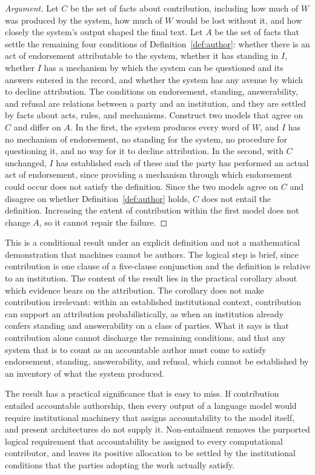 \documentclass[12pt]{article}
\theoremstyle{definition}
\theoremstyle{plain}
\begin{document}
\begin{proof}[Argument]
Let $C$ be the set of facts about contribution, including how much of $W$ was produced by the system, how much of $W$ would be lost without it, and how closely the system's output shaped the final text. Let $A$ be the set of facts that settle the remaining four conditions of Definition~\ref{def:author}: whether there is an act of endorsement attributable to the system, whether it has standing in $I$, whether $I$ has a mechanism by which the system can be questioned and its answers entered in the record, and whether the system has any avenue by which to decline attribution. The conditions on endorsement, standing, answerability, and refusal are relations between a party and an institution, and they are settled by facts about acts, rules, and mechanisms. Construct two models that agree on $C$ and differ on $A$. In the first, the system produces every word of $W$, and $I$ has no mechanism of endorsement, no standing for the system, no procedure for questioning it, and no way for it to decline attribution. In the second, with $C$ unchanged, $I$ has established each of these and the party has performed an actual act of endorsement, since providing a mechanism through which endorsement could occur does not satisfy the definition. Since the two models agree on $C$ and disagree on whether Definition~\ref{def:author} holds, $C$ does not entail the definition. Increasing the extent of contribution within the first model does not change $A$, so it cannot repair the failure.
\end{proof}

This is a conditional result under an explicit definition and not a mathematical demonstration that machines cannot be authors. The logical step is brief, since contribution is one clause of a five-clause conjunction and the definition is relative to an institution. The content of the result lies in the practical corollary about which evidence bears on the attribution. The corollary does not make contribution irrelevant: within an established institutional context, contribution can support an attribution probabilistically, as when an institution already confers standing and answerability on a class of parties. What it says is that contribution alone cannot discharge the remaining conditions, and that any system that is to count as an accountable author must come to satisfy endorsement, standing, answerability, and refusal, which cannot be established by an inventory of what the system produced.

The result has a practical significance that is easy to miss. If contribution entailed accountable authorship, then every output of a language model would require institutional machinery that assigns accountability to the model itself, and present architectures do not supply it. Non-entailment removes the purported logical requirement that accountability be assigned to every computational contributor, and leaves its positive allocation to be settled by the institutional conditions that the parties adopting the work actually satisfy.
\end{document}
